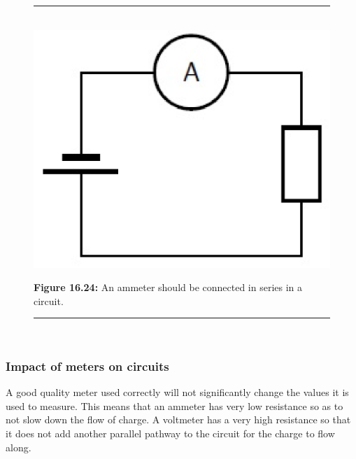     \setcounter{subfigure}{0}


	\begin{figure}[H] %
    \begin{center}
    \rule[.1in]{\figurerulewidth}{.005in} \\
        \label{m38773*uid75!!!underscore!!!media}\label{m38773*uid75!!!underscore!!!printimage}\includegraphics[width=0.4\columnwidth]{col11305.imgs/m38773_PG10C9_035.png} %
        
      \vspace{2pt}
    \vspace{\rubberspace}\par \begin{cnxcaption}
	  \small \textbf{Figure 16.24: }An ammeter should be connected in series in a circuit.
	\end{cnxcaption}
      
    \vspace{.1in}
    \rule[.1in]{\figurerulewidth}{.005in} \\
        
    \end{center}

 \end{figure}   

    \addtocounter{footnote}{-0}
    
      

 

      \label{m38773*uid78}
            \subsubsection{ Impact of meters on circuits}
            \nopagebreak
            
        
        \label{m38773*id67854}A good quality meter used correctly will not significantly change
the values it is used to measure. This means that an ammeter has
very low resistance so as to not slow down the flow of charge. A voltmeter has a very high resistance so that it does not add another
parallel pathway to the circuit for the charge to flow along.\par 
\label{m38773*secfhsst!!!underscore!!!id1891}

